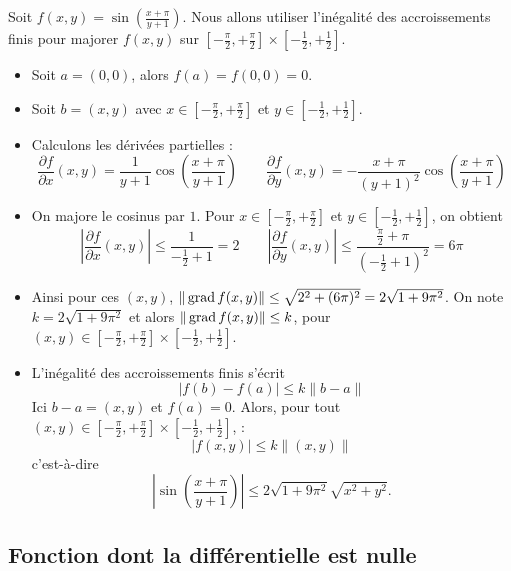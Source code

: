 \documentclass[12pt, class=report,crop=false]{standalone}
\begin{document}
\begin{exemple}
Soit $f(x,y) = \sin \left( \frac{x+\pi}{y+1} \right)$. 
Nous allons utiliser l'inégalité des accroissements finis pour majorer
$f(x,y)$ sur $[-\frac\pi2,+\frac\pi2] \times [-\frac12,+\frac12]$.

\begin{itemize}
  \item Soit $a=(0,0)$, alors $f(a) = f(0,0) = 0$.
  
  \item Soit $b=(x,y)$ avec $x \in [-\frac\pi2,+\frac\pi2]$ et $y \in [-\frac12,+\frac12]$.
  
  
  \item Calculons les dérivées partielles :
  $$\frac{\partial f}{\partial x}(x,y) =  \frac{1}{y+1}\cos \left( \frac{x+\pi}{y+1} \right) \qquad
\frac{\partial f}{\partial y}(x,y) = - \frac{x+\pi}{(y+1)^2} \cos \left( \frac{x+\pi}{y+1} \right) $$  

  \item On majore le cosinus par $1$. Pour  $x \in [-\frac\pi2,+\frac\pi2]$ et $y \in [-\frac12,+\frac12]$, on obtient
  $$ \left|\frac{\partial f}{\partial x}(x,y)\right| \le \frac{1}{-\frac12+1} = 2 \qquad
\left|\frac{\partial f}{\partial y}(x,y)\right| \le \frac{\frac\pi2+\pi}{(-\frac12+1)^2}  = 6\pi$$

  \item Ainsi pour ces $(x,y)$, $\|\operatorname{grad} f(x,y)\| \le \sqrt{ 2^2 + (6\pi)^2} = 2\sqrt{1+9\pi^2}$.
  On note $k = 2\sqrt{1+9\pi^2}$ et alors $\| \operatorname{grad} f (x,y) \| \le  k$, pour $(x,y) \in [-\frac\pi2,+\frac\pi2] \times [-\frac12,+\frac12]$.
  
  
  \item L'inégalité des accroissements finis s'écrit 
 $$ \left| f(b)-f(a)  \right| \le k   \| b -a \|$$
 Ici $b-a = (x,y)$ et $f(a)=0$. Alors, pour tout $(x,y) \in [-\frac\pi2,+\frac\pi2] \times [-\frac12,+\frac12]$, :
 $$\left| f(x,y) \right| \le k \| (x,y) \|$$
c'est-à-dire 
 $$\left|  \sin \left( \frac{x+\pi}{y+1} \right) \right| \le 2\sqrt{1+9\pi^2} \sqrt{x^2+y^2}.$$ 
  
\end{itemize}



\end{exemple}


\subsection{Fonction dont la différentielle est nulle}
 
\end{document}
